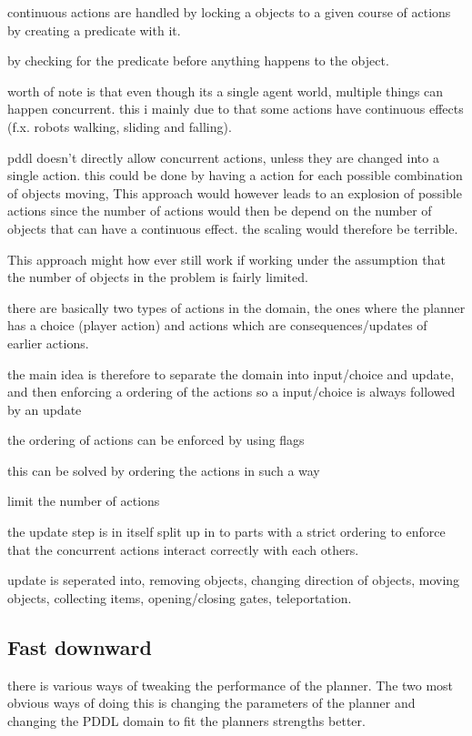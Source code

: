 	continuous actions are handled by locking a objects to a given course of actions by creating a predicate with it.
		
	by checking for the predicate before anything happens to the object.
	
	
	worth of note is that even though its a single agent world, multiple things can happen concurrent. this i mainly due to that some actions have continuous effects (f.x. robots walking, sliding and falling).
	

	pddl doesn't directly allow concurrent actions, unless they are changed into a single action. this could be done by having a action for each possible combination of objects moving, This approach would however leads to an explosion of possible actions since the number of actions would then be depend on the number of objects that can have a continuous effect. the scaling would therefore be terrible.
	
	This approach might how ever still work if working under the assumption that the number of objects in the problem is fairly limited. 
	
	
	there are basically two types of actions in the domain, the ones where the planner has a choice (player action) and actions which are consequences/updates of earlier actions. 
	
	the main idea is therefore to separate the domain into input/choice and update, and then enforcing a ordering of the actions so a input/choice is always followed by an update
	
	
	the ordering of actions can be enforced by using flags
	
	this can be solved by ordering the actions in such a way
	
	
	limit the number of actions
	
	
	

	
	
	
	the update step is in itself split up in to parts with a strict ordering to enforce that the concurrent actions interact correctly with each others.
	
	
	update is seperated into, removing objects, changing direction of objects, moving objects, collecting items, opening/closing gates, teleportation.

	 


	 
	 
\subsection{Fast downward}
	there is various ways of tweaking the performance of the planner. The two most obvious ways of doing this is changing the parameters of the planner and changing the PDDL domain to fit the planners strengths better.
	
